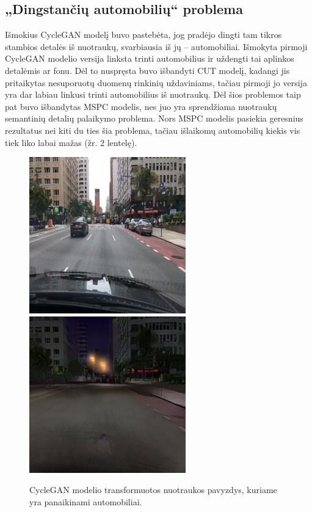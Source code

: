 \documentclass{VUMIFPSkursinis}
\begin{document}
        \subsection{„Dingstančių automobilių“ problema}
            Išmokius CycleGAN modelį buvo pastebėta, jog pradėjo dingti tam tikros stambios detalės iš nuotraukų, svarbiausia iš jų – automobiliai. Išmokyta pirmoji CycleGAN modelio versija linksta trinti automobilius ir uždengti tai aplinkos detalėmis ar fonu. Dėl to nuspręsta buvo išbandyti CUT modelį, kadangi jis pritaikytas nesuporuotų duomenų rinkinių uždaviniams, tačiau pirmoji jo versija yra dar labiau linkusi trinti automobilius iš nuotraukų. Dėl šios problemos taip pat buvo išbandytas MSPC modelis, nes juo yra sprendžiama nuotraukų semantinių detalių palaikymo problema. Nors MSPC modelis pasiekia geresnius rezultatus nei kiti du ties šia problema, tačiau išlaikomų automobilių kiekis vis tiek liko labai mažas (žr. 2 lentelę).
            \begin{figure}[H]
                \centering
                \includegraphics[scale=0.8]{img/CycleGANV1/1_real_B}
                \includegraphics[scale=0.8]{img/CycleGANV1/1_fake_A}
                \captionsetup{width=.8\linewidth}
                \caption{CycleGAN modelio transformuotos nuotraukos pavyzdys, kuriame yra panaikinami automobiliai.}
                \label{img:mlp}
            \end{figure}
\end{document}
